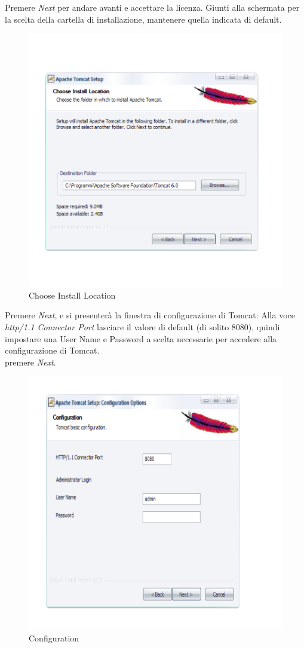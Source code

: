 Premere \textit{Next} per andare avanti e accettare la licenza.
Giunti alla schermata per la scelta della cartella di installazione, mantenere quella indicata di default.

\begin{figure}[!ht]
\centering
\includegraphics[scale=0.7]{images/InstallTomcat2.png}
\caption{Choose Install Location}
\end{figure} 
\newpage

Premere \textit{Next}, e si presenter\`a la finestra di configurazione di Tomcat:
Alla voce \textit{http/1.1 Connector Port} lasciare il valore di default (di solito 8080), quindi impostare una User Name e Password a scelta necessarie per accedere alla configurazione di Tomcat.\\
premere \textit{Next}.

\begin{figure}[!ht]
\centering
\includegraphics[scale=0.7]{images/InstallTomcat3.png}
\caption{Configuration}
\end{figure} 

